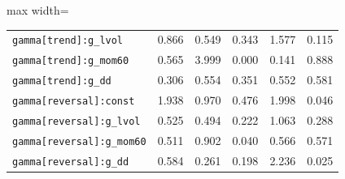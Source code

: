 \begin{table}[!htbp]
\begin{adjustbox}{max width=\textwidth}
\begin{tabular}{lrrrrr}
\texttt{gamma[trend]:g\_lvol} & 0.866 & 0.549 & 0.343 & 1.577 & 0.115\\
\texttt{gamma[trend]:g\_mom60} & 0.565 & 3.999 & 0.000 & 0.141 & 0.888\\
\texttt{gamma[trend]:g\_dd} & 0.306 & 0.554 & 0.351 & 0.552 & 0.581\\
\texttt{gamma[reversal]:const} & 1.938 & 0.970 & 0.476 & 1.998 & 0.046\\
\texttt{gamma[reversal]:g\_lvol} & 0.525 & 0.494 & 0.222 & 1.063 & 0.288\\
\texttt{gamma[reversal]:g\_mom60} & 0.511 & 0.902 & 0.040 & 0.566 & 0.571\\
\texttt{gamma[reversal]:g\_dd} & 0.584 & 0.261 & 0.198 & 2.236 & 0.025\\
\bottomrule
\end{tabular}
\end{adjustbox}
\end{table}